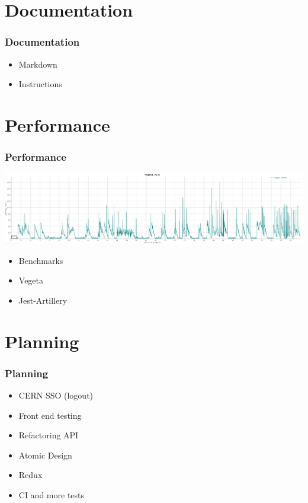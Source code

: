 \documentclass[12pt]{beamer}
\begin{document}
	\section{Documentation}
	\begin{frame}
		\frametitle{Documentation}
		\begin{itemize}
			\item Markdown
			\item Instructions
		\end{itemize}
	\end{frame}

	\section{Performance}
	\begin{frame}
		\frametitle{Performance}
		\includegraphics[scale=0.15]{vegeta-plot.png}
		\begin{itemize}
			\item Benchmarks
			\item Vegeta
			\item Jest-Artillery
		\end{itemize}
	\end{frame}

	\section{Planning}
	\begin{frame}
		\frametitle{Planning}
		\begin{itemize}
			\item CERN SSO (logout)
			\item Front end testing
			\item Refactoring API
			\item Atomic Design
			\item Redux
			\item CI and more tests
		\end{itemize}
	\end{frame}
\end{document}
